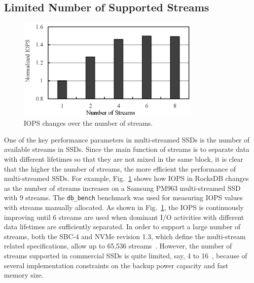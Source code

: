 \subsection{Limited Number of Supported Streams}
\label{sec:limitedstreams}

\begin{figure}[t]
	\centering
	\includegraphics[width=0.8\textwidth]{figure/pcstream/stream_perf}
	\caption{IOPS changes over the number of streams.}
	\label{fig:stream_perf}
\end{figure}

One of the key performance parameters in multi-streamed SSDs is the number of
available streams in SSDs.  Since the main function of  streams is to separate
data with different lifetimes so that they are not mixed in the same block, it
is clear that the higher the number of streams, the more efficient the
performance of multi-streamed SSDs.  For example, Fig.~\ref{fig:stream_perf}
shows how IOPS in RocksDB changes as the number of streams increases on a
Samsung PM963 multi-streamed SSD with 9 streams.  The \texttt{db\_bench}
benchmark was used for measuring IOPS values with streams manually allocated.
As shown in Fig.~\ref{fig:stream_perf}, the IOPS is continuously improving
until 6 streams are used when dominant I/O activities with different data
lifetimes are sufficiently separated.  In order to support a large number of
streams, both the SBC-4 and NVMe revision 1.3, which define the multi-stream
related specifications, allow up to 65,536 streams~\cite{T10, NVMe}.  However,
the number of streams supported in commercial SSDs is quite limited, say, 4 to
16~\cite{MultiStream, Level, AutoStream}, because of several implementation
constraints on the backup power capacity and fast memory size.

